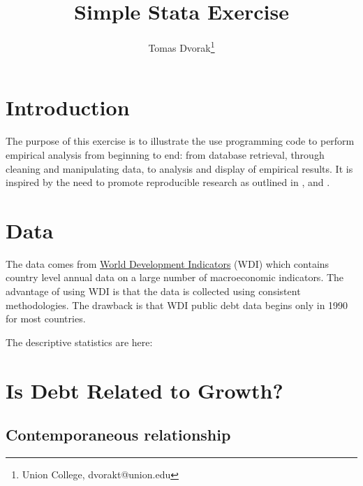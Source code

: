 \documentclass[letterpaper,11pt]{article}
\begin{document}
\title{\vspace{-0.5in} Simple Stata Exercise}
\author{Tomas Dvorak\thanks{Union College, dvorakt@union.edu}}

\maketitle

\section{Introduction}
The purpose of this exercise is to illustrate the use programming code to perform empirical analysis from beginning to end: from database retrieval, through cleaning and manipulating data, to analysis and display of empirical results. It is inspired by the need to promote reproducible research as outlined in \cite{ball2012teaching}, \cite{gentzkow2014code} and \cite{hoffler2017replication}. 

\section{Data}

The data comes from \href{http://databank.worldbank.org/data/reports.aspx?source=world-development-indicators&preview=on}{World Development Indicators} (WDI) which contains country level annual data on a large number of macroeconomic indicators. The advantage of using WDI is that the data is collected using consistent methodologies. The drawback is that WDI public debt data begins only in 1990 for most countries. 

The descriptive statistics are here:




\section{Is Debt Related to Growth?}
\subsection{Contemporaneous relationship}
\end{document}
